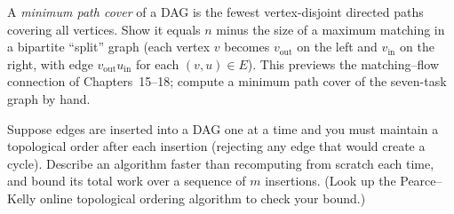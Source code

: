 \begin{exercise}
A \emph{minimum path cover} of a DAG is the fewest vertex-disjoint directed paths covering all
vertices. Show it equals $n$ minus the size of a maximum matching in a bipartite ``split'' graph
(each vertex $v$ becomes $v_{\text{out}}$ on the left and $v_{\text{in}}$ on the right, with edge
$v_{\text{out}}u_{\text{in}}$ for each $(v,u)\in E$). This previews the matching--flow connection of
Chapters~15--18; compute a minimum path cover of the seven-task graph by hand.
\end{exercise}

\begin{exercise}
Suppose edges are inserted into a DAG one at a time and you must maintain a topological order after
each insertion (rejecting any edge that would create a cycle). Describe an algorithm faster than
recomputing from scratch each time, and bound its total work over a sequence of $m$ insertions.
(Look up the Pearce--Kelly online topological ordering algorithm to check your bound.)
\end{exercise}
